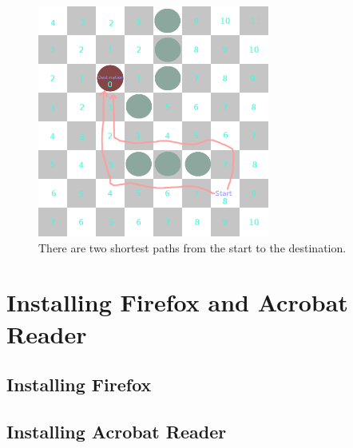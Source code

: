 \documentclass[12pt]{amsbook}
\theoremstyle{definition}
\theoremstyle{remark}
\numberwithin{figure}{chapter}
\numberwithin{table}{chapter}
\numberwithin{section}{chapter}
\numberwithin{equation}{section}
\begin{document}
\begin{figure}[h]
  \includegraphics[width=3in]{CheckerboardSolution.png}
  \caption{There are two shortest paths from the start to the destination.}
  \label{fig:checkerboard-solution}
\end{figure}

\chapter{Installing Firefox and Acrobat Reader}

\section{Installing Firefox}

\section{Installing Acrobat Reader}

\backmatter


\printindex
\end{document}
